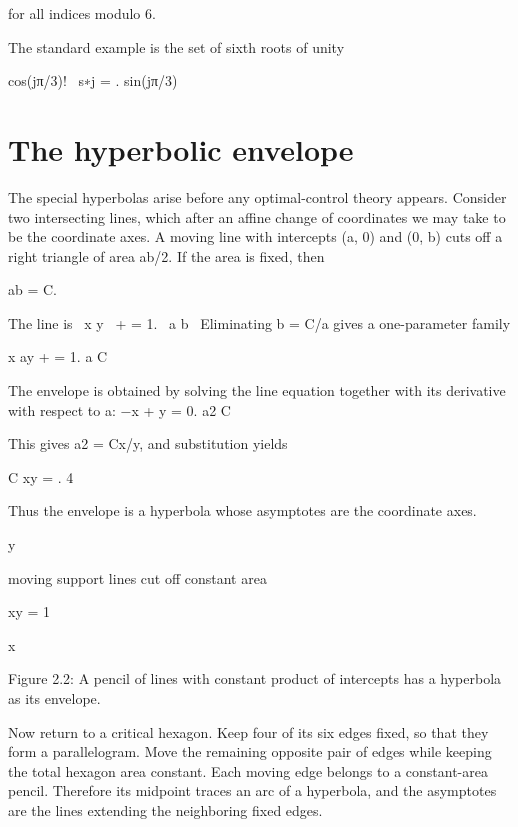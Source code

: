 for all indices modulo 6.


The standard example is the set of sixth roots of unity


\begin{displaytext}
cos(jπ/3)! \
s∗j = . sin(jπ/3)
\end{displaytext}

\section{The hyperbolic envelope}

The special hyperbolas arise before any optimal-control theory appears. Consider two intersecting lines, which after an affine change of coordinates we may take to be the coordinate axes. A moving line with intercepts (a, 0) and (0, b) cuts off a right triangle of area ab/2. If the area is fixed, then


ab = C.


\begin{displaytext}
The line is \
x y \
+ = 1. \
a b \
Eliminating b = C/a gives a one-parameter family
\end{displaytext}

x ay + = 1. a C


The envelope is obtained by solving the line equation together with its derivative with respect to a: −x + y = 0. a2 C


This gives a2 = Cx/y, and substitution yields


C xy = . 4


Thus the envelope is a hyperbola whose asymptotes are the coordinate axes.


y


moving support lines cut off constant area


xy = 1


x


\begin{figureplaceholder}
Figure 2.2: A pencil of lines with constant product of intercepts has a hyperbola as its envelope.
\end{figureplaceholder}

Now return to a critical hexagon. Keep four of its six edges fixed, so that they form a parallelogram. Move the remaining opposite pair of edges while keeping the total hexagon area constant. Each moving edge belongs to a constant-area pencil. Therefore its midpoint traces an arc of a hyperbola, and the asymptotes are the lines extending the neighboring fixed edges.


